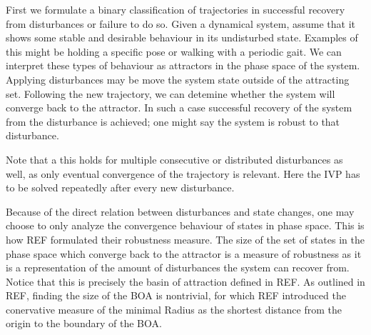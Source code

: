     First we formulate a binary classification of trajectories in successful recovery from disturbances or failure to do so. %
    Given a dynamical system, assume that it shows some stable and desirable behaviour in its undisturbed state. Examples of this might be holding a specific pose or walking with a periodic gait. We can interpret these types of behaviour as attractors in the phase space of the system. Applying disturbances may be move the system state outside of the attracting set. Following the new trajectory, we can detemine whether the system will converge back to the attractor. In such a case successful recovery of the system from the disturbance is achieved; one might say the system is robust to that disturbance. %





    Note that a this holds for multiple consecutive or distributed disturbances as well, as only eventual convergence of the trajectory is relevant. Here the IVP has to be solved repeatedly after every new disturbance. %






    Because of the direct relation between disturbances and state changes, one may choose to only analyze the convergence behaviour of states in phase space. This is how REF formulated their robustness measure. The size of the set of states in the phase space which converge back to the attractor is a measure of robustness as it is a representation of the amount of disturbances the system can recover from. Notice that this is precisely the basin of attraction defined in REF. As outlined in REF, finding the size of the BOA is nontrivial, for which REF introduced the conervative measure of the minimal Radius as the shortest distance from the origin to the boundary of the BOA.

